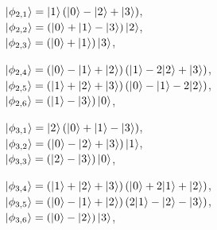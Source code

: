 \begin{example}
\vspace{2mm}

\noindent\hspace{8pt}
\begin{minipage}{0.48\textwidth}
  $\ket{\phi_{2,1}} = \ket{1}\left(\ket{0} - \ket{2} + \ket{3}\right)$,\\
  $\ket{\phi_{2,2}} = \left(\ket{0} + \ket{1} - \ket{3}\right)\ket{2}$,\\
  $\ket{\phi_{2,3}} =  \left(\ket{0} + \ket{1}\right)\ket{3}$,
\end{minipage}\hfill
\begin{minipage}{0.48\textwidth}
  $\ket{\phi_{2,4}} = \left(\ket{0} - \ket{1} + \ket{2}\right)
  \left(\ket{1} - 2\ket{2} + \ket{3}\right)$, \\
  $\ket{\phi_{2,5}} = \left(\ket{1} + \ket{2} + \ket{3}\right)
  \left(\ket{0} - \ket{1} - 2\ket{2}\right)$, \\
  $\ket{\phi_{2,6}} = \left(\ket{1} - \ket{3}\right)\ket{0}$,
\end{minipage}

\vspace{2mm}

\noindent\hspace{8pt}
\begin{minipage}{0.48\textwidth}   
  $\ket{\phi_{3,1}} = \ket{2}\left(\ket{0} + \ket{1} - \ket{3}\right)$,\\
  $\ket{\phi_{3,2}} = \left(\ket{0} - \ket{2} + \ket{3}\right)\ket{1}$,\\
  $\ket{\phi_{3,3}} =  \left(\ket{2} - \ket{3}\right)\ket{0}$,
\end{minipage}\hfill
\begin{minipage}{0.48\textwidth}
  $\ket{\phi_{3,4}} = \left(\ket{1} + \ket{2} + \ket{3}\right)
  \left(\ket{0} + 2\ket{1} + \ket{2}\right)$, \\
  $\ket{\phi_{3,5}} = \left(\ket{0} - \ket{1} + \ket{2}\right)
  \left(2\ket{1} - \ket{2} - \ket{3}\right)$, \\
  $\ket{\phi_{3,6}} = \left(\ket{0} - \ket{2}\right)\ket{3}$,
\end{minipage}

\vspace{2mm}


\end{example}

